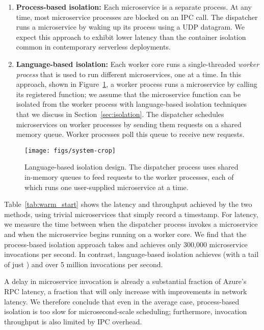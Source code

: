 \begin{enumerate}
\item \textbf{Process-based isolation:} Each microservice is a separate process.
At any time, most microservice processes are blocked on an IPC
call. The dispatcher runs a microservice by waking up its process using a UDP datagram.
We expect this approach to exhibit lower latency than the container isolation common
in contemporary serverless deployments.
\item \textbf{Language-based isolation:} Each worker core runs a single-threaded
\emph{worker process} that is used to run different microservices, one at a time.
In this approach, shown in Figure~\ref{fig:sysdesign}, a worker process runs a
microservice by calling its registered
function; we assume that the microservice function can be isolated from the
worker process with language-based isolation techniques that we discuss in
Section~\ref{sec:isolation}. The dispatcher schedules microservices on worker
processes by sending them
requests on a shared memory queue. Worker processes poll this queue to receive
new requests.
\end{enumerate}

\begin{figure}
\texttt{[image: figs/system-crop]}
\caption{Language-based isolation design.  The dispatcher process
uses shared in-memory queues to feed requests to the worker processes, each of
which runs one user-supplied microservice at a time.}
\label{fig:sysdesign}
\end{figure}

Table~\ref{tab:warm_start} shows the latency and throughput achieved
by the two methods, using trivial microservices that simply record a timestamp. For
latency, we measure the time between when the dispatcher
process invokes a microservice and when the microservice begins
running on a worker core. We find that the process-based isolation approach
takes  and achieves only 300,000 microservice invocations per
second. In contrast, language-based isolation achieves  (with a tail
of just ) and over 5 million invocations per second.

A  delay in microservice invocation is already a substantial fraction of
Azure's  RPC latency, a fraction that will only increase with
improvements in network latency. We therefore conclude that even in the average case,
process-based isolation is too slow for microsecond-scale scheduling; furthermore,
invocation throughput is also limited by IPC overhead.

